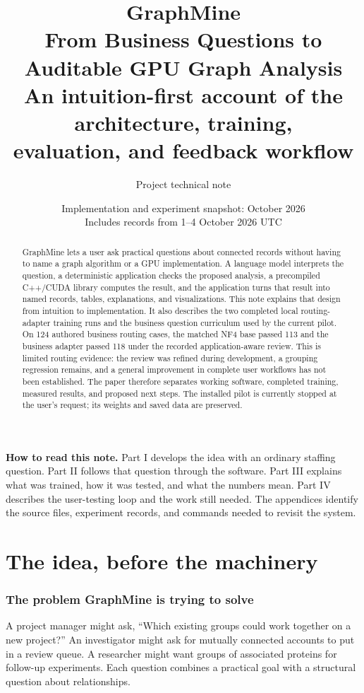 \documentclass[11pt,a4paper]{article}
\title{\vspace{-1em}\textbf{\textcolor{ink}{GraphMine}}\\[0.4em]
  \Large From Business Questions to Auditable GPU Graph Analysis\\[0.6em]
  \large An intuition-first account of the architecture, training,\\
  evaluation, and feedback workflow}
\author{Project technical note}
\date{Implementation and experiment snapshot: October 2026\\
  \small Includes records from 1--4 October 2026 UTC}
\begin{document}
\maketitle

\begin{abstract}
GraphMine lets a user ask practical questions about connected records without
having to name a graph algorithm or a GPU implementation. A language model
interprets the question, a deterministic application checks the proposed
analysis, a precompiled C++/CUDA library computes the result, and the application
turns that result into named records, tables, explanations, and visualizations.
This note explains that design from intuition to implementation. It also
describes the two completed local routing-adapter training runs and the business
question curriculum used by the current pilot. On 124 authored business routing
cases, the matched NF4 base passed 113 and the business adapter passed 118 under
the recorded application-aware review. This is limited routing evidence: the
review was refined during development, a grouping regression remains, and a
general improvement in complete user workflows has not been established.
The paper therefore separates working software, completed training, measured
results, and proposed next steps. The installed pilot is currently stopped at
the user's request; its weights and saved data are preserved.
\end{abstract}

\textbf{How to read this note.} Part I develops the idea with an ordinary staffing
question. Part II follows that question through the software. Part III explains
what was trained, how it was tested, and what the numbers mean. Part IV describes
the user-testing loop and the work still needed. The appendices identify the
source files, experiment records, and commands needed to revisit the system.

\clearpage
\begingroup
\small
\setlength{\parskip}{0pt}
\tableofcontents
\endgroup
\clearpage

\part{The idea, before the machinery}

\section{The problem GraphMine is trying to solve}

A project manager might ask, ``Which existing groups could work together on a
new project?'' An investigator might ask for mutually connected accounts to put
in a review queue. A researcher might want groups of associated proteins for
follow-up experiments. Each question combines a practical goal with a structural
question about relationships.
\end{document}
